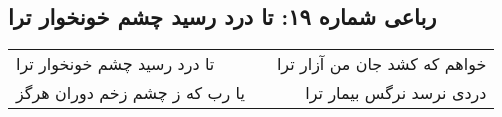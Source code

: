\begin{center}
\section*{رباعی شماره ۱۹: تا درد رسید چشم خونخوار ترا}
\label{sec:sh019}
\begin{longtable}{l p{0.5cm} r}
تا درد رسید چشم خونخوار ترا
&&
خواهم که کشد جان من آزار ترا
\\
یا رب که ز چشم زخم دوران هرگز
&&
دردی نرسد نرگس بیمار ترا
\\
\end{longtable}
\end{center}

